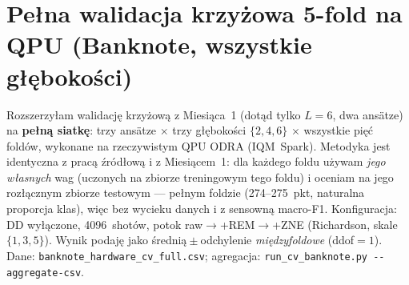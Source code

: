 \documentclass[11pt,a4paper]{article}
\begin{document}
\FloatBarrier

\section{Pełna walidacja krzyżowa 5-fold na QPU (Banknote, wszystkie głębokości)}
\label{sec:cv-full}

Rozszerzyłam walidację krzyżową z Miesiąca~1 (dotąd tylko $L=6$, dwa ansätze) na
\textbf{pełną siatkę}: trzy ansätze $\times$ trzy głębokości $\{2,4,6\}$ $\times$ wszystkie
pięć foldów, wykonane na rzeczywistym QPU ODRA (IQM~Spark). Metodyka jest identyczna z pracą
źródłową i z Miesiącem~1: dla każdego foldu używam \emph{jego własnych} wag (uczonych na
zbiorze treningowym tego foldu) i oceniam na jego rozłącznym zbiorze testowym --- pełnym
foldzie (274--275~pkt, naturalna proporcja klas), więc bez wycieku danych i z sensowną
macro-F1. Konfiguracja: DD wyłączone, 4096~shotów, potok raw${}\to{}$+REM${}\to{}$+ZNE
(Richardson, skale $\{1,3,5\}$). Wynik podaję jako średnią${}\pm{}$odchylenie
\emph{międzyfoldowe} (ddof${}=1$). Dane: \texttt{banknote\_hardware\_cv\_full.csv};
agregacja: \texttt{run\_cv\_banknote.py -\/-aggregate-csv}.
\end{document}
